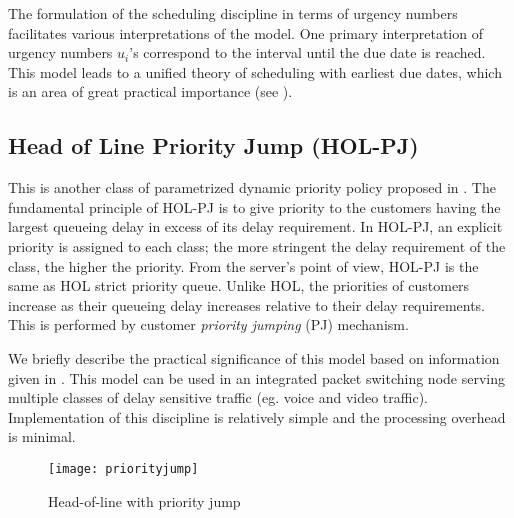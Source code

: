 \documentclass[letterpaper, 10 pt, conference]{ieeeconf}  %
\begin{document}
The formulation of the scheduling discipline in terms of urgency numbers facilitates various interpretations of the model. One primary interpretation of urgency numbers $u_i$'s correspond to the interval until the due date is reached. This model leads to a unified theory of scheduling with earliest due dates, which is an area of great practical importance (see \cite{EDDpriority}).
\subsection{Head of Line Priority Jump (HOL-PJ)}
This is another class of parametrized dynamic priority policy proposed in \cite{holpj}. The fundamental principle of HOL-PJ is to give priority to the customers having the largest queueing delay in excess of its delay requirement. In HOL-PJ, an explicit priority is assigned to each class; the more stringent the delay requirement of the class, the higher the priority. From the server's point of view, HOL-PJ is the same as HOL strict priority queue. Unlike HOL, the priorities of customers increase as their queueing delay increases relative to their delay requirements. This is performed by customer \textit{priority jumping} (PJ) mechanism.

We briefly describe the practical significance of this model based on information given in \cite{holpj}. This model can be used in an integrated packet switching node serving multiple classes of delay sensitive traffic (eg. voice and video traffic). Implementation of this discipline is relatively simple and the processing overhead is minimal.

\begin{figure}[htb!]
\centering
\texttt{[image: priorityjump]}
\caption{Head-of-line with priority jump \cite{holpj}}
\label{PriortyJump}
\end{figure}
\end{document}
